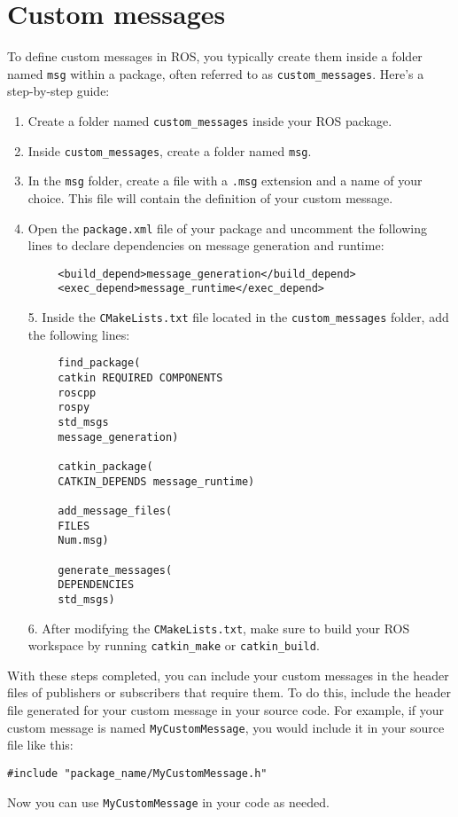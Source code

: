 \section{Custom messages}

To define custom messages in ROS, you typically create them inside a folder named \texttt{msg} within a package, often referred to as \texttt{custom\_messages}. 
Here's a step-by-step guide:
\begin{enumerate}
    \item Create a folder named \texttt{custom\_messages} inside your ROS package.
    \item Inside \texttt{custom\_messages}, create a folder named \texttt{msg}.
    \item In the \texttt{msg} folder, create a file with a \texttt{.msg} extension and a name of your choice. 
        This file will contain the definition of your custom message.
    \item Open the \texttt{package.xml} file of your package and uncomment the following lines to declare dependencies on message generation and runtime:
\end{enumerate}      
\begin{verbatim}
        <build_depend>message_generation</build_depend>
        <exec_depend>message_runtime</exec_depend>
\end{verbatim}
\begin{enumerate}
    \item [5.] Inside the \texttt{CMakeLists.txt} file located in the \texttt{custom\_messages} folder, add the following lines:
\end{enumerate}  
\begin{verbatim}
        find_package(
        catkin REQUIRED COMPONENTS
        roscpp
        rospy
        std_msgs
        message_generation)

        catkin_package(
        CATKIN_DEPENDS message_runtime)

        add_message_files(
        FILES
        Num.msg)

        generate_messages(
        DEPENDENCIES
        std_msgs)
\end{verbatim}
\begin{enumerate}
    \item [6.] After modifying the \texttt{CMakeLists.txt}, make sure to build your ROS workspace by running \texttt{catkin\_make} or \texttt{catkin\_build}.
\end{enumerate}
With these steps completed, you can include your custom messages in the header files of publishers or subscribers that require them. 
To do this, include the header file generated for your custom message in your source code. 
For example, if your custom message is named \texttt{MyCustomMessage}, you would include it in your source file like this:
\begin{verbatim}
#include "package_name/MyCustomMessage.h"
\end{verbatim}
Now you can use \texttt{MyCustomMessage} in your code as needed.